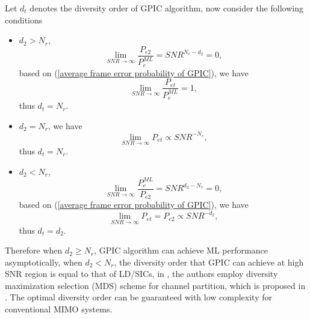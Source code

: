 \documentclass[12pt, draftclsnofoot, onecolumn]{IEEEtran}
\begin{document}
Let $d_{t}$ denotes the diversity order of GPIC algorithm, now consider the following conditions
\begin{itemize}
\item $d_{2}>N_{r}$,
\begin{equation}
\lim_{SNR\to\infty}\frac{P_{e2}}{P^{ML}_{e}}=SNR^{N_{r}-d_{2}}=0,
\label{condition1sub1}
\end{equation}
based on (\ref{average frame error probability of GPIC}), we have
\begin{equation}
\lim_{SNR\to\infty}\frac{P_{et}}{P^{ML}_{e}}=1,
\label{condition1sub2}
\end{equation}
thus $d_{t}=N_{r}$.
\item $d_2=N_{r}$,
we have 
\begin{equation}
\lim_{SNR\to\infty}P_{et}\propto SNR^{-N_{r}},
\label{condition2sub1}
\end{equation}
thus $d_{t}=N_{r}$.
\item $d_{2}<N_{r}$,
\begin{equation}
\lim_{SNR\to\infty}\frac{P^{ML}_{e}}{P_{e2}}=SNR^{d_{2}-N_{r}}=0,
\label{condition3sub1}
\end{equation}
based on (\ref{average frame error probability of GPIC}), we have  
\begin{equation}
\lim_{SNR\to\infty}P_{et}=P_{e2}\propto SNR^{-d_{2}},
\label{condition3sub2}
\end{equation}
thus 
$d_{t}=d_{2}$.
\end{itemize} 
Therefore when $d_{2}\geq N_{r}$, GPIC algorithm can achieve ML performance asymptotically, when $d_{2}<N_{r}$, the diversity order that GPIC can achieve at high SNR region is equal to that of LD/SICs, in \cite{radji2009interference}, the authors employ diversity maximization selection (MDS) scheme for channel partition, which is proposed in \cite{zhang2006diversity}. The optimal diversity order can be guaranteed with low complexity for conventional MIMO systems.
\end{document}
